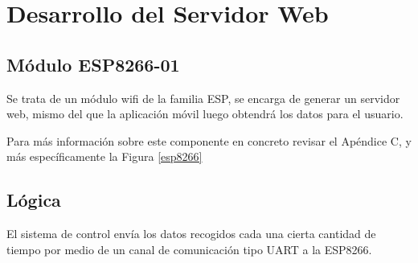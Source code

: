                     
                
        \section{Desarrollo del Servidor Web}
            
            \subsection{Módulo ESP8266-01}
                Se trata de un módulo wifi de la familia ESP, se encarga de generar un servidor web, mismo del que la aplicación móvil luego obtendrá los datos para el usuario.\par
                Para más información sobre este componente en concreto revisar el Apéndice C, y más específicamente la Figura \ref{esp8266}\par
            
            \subsection{Lógica}
                El sistema de control envía los datos recogidos cada una cierta cantidad de tiempo por medio de un canal de comunicación tipo UART a la ESP8266.\par